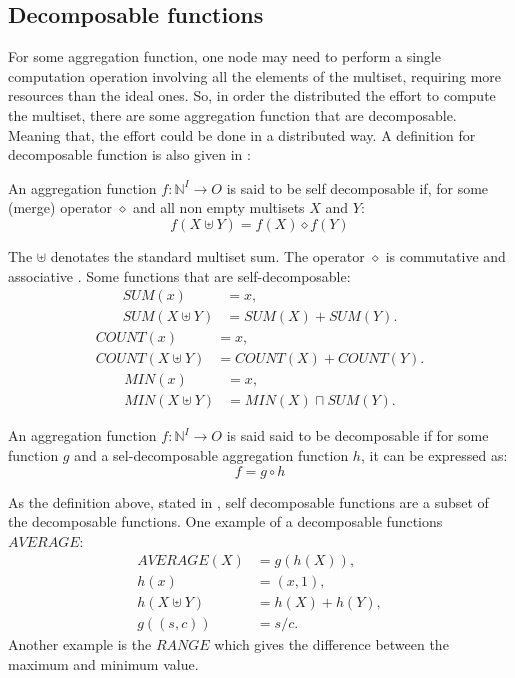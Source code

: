 \subsection {Decomposable functions}
For some aggregation function, one node may need to perform a single computation operation involving all the elements of the multiset, requiring more resources than the ideal ones. So, in order the distributed the effort to compute the multiset, there are some aggregation function that are decomposable. Meaning that, the effort could be done in a distributed way. A definition for decomposable function is also given in \cite{journals/corr/abs-1110-0725}:
\begin{definition} An aggregation function $ f : \mathbb{N}^I \to O$ is said to be self decomposable if, for some (merge) operator $\diamond$ and all non empty multisets $X$ and $Y$:
\begin{equation*}f(X \uplus Y) = f(X) \diamond f(Y) \end{equation*}
\end{definition}
The $\uplus$ denotates the standard multiset sum. The operator $\diamond$ is commutative and associative \cite{journals/corr/abs-1110-0725}. Some functions that are self-decomposable:
\begin{align*}SUM ({x}) &= x,\\
SUM(X \uplus Y) &= SUM(X)+SUM(Y).\end{align*}
\begin{align*}COUNT ({x}) &= x,  \\
COUNT(X \uplus Y)& = COUNT(X)+COUNT(Y).\end{align*}
\begin{align*}MIN ({x}) &= x,\\
MIN(X \uplus Y) &= MIN(X) \sqcap SUM(Y).\end{align*}
\begin{definition}
An aggregation function $ f : \mathbb{N}^I \to O$ is said said to be decomposable if for some function $g$ and a sel-decomposable aggregation function $h$, it can be expressed as:
\begin{equation*}f=g \circ h\end{equation*}
\end{definition}
As the definition above, stated in \cite{journals/corr/abs-1110-0725}, self decomposable functions are a subset of the decomposable functions. One example of a decomposable functions $AVERAGE$:
\begin{align*} 
AVERAGE(X) &= g(h(X)),\\
h({x}) &= (x,1),\\
h(X \uplus Y) &= h(X) + h(Y),\\
g((s,c)) &= s/c. \end{align*}
Another example is the $RANGE$ which gives the difference between the maximum and minimum value.


